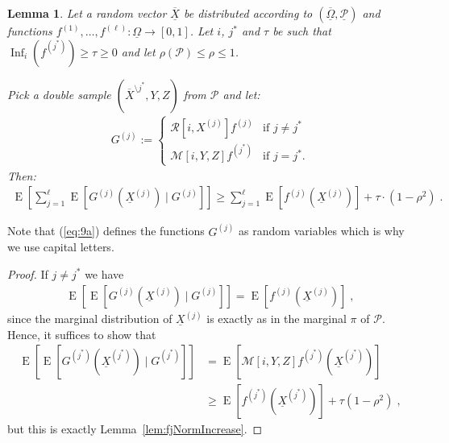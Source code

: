 \documentclass{daj}
\newcommand{\1}{\mathbbm{1}}
\theoremstyle{plain}
\newtheorem{lemma}[theorem]{Lemma}
\theoremstyle{definition}
\DeclareMathOperator*{\EE}{E}
\DeclareMathOperator{\Inf}{Inf}
\newcommand{\cM}{\mathcal{M}}
\newcommand{\cR}{\mathcal{R}}
\begin{document}
\begin{lemma}\label{lem:averageNormIncrease}
Let a random vector $\overline{\underline{X}}$ be distributed according to
$(\overline{\underline{\Omega}}, \underline{\mathcal{P}})$ and functions
$f^{(1)}, \ldots, f^{(\ell)}: \underline{\Omega} \to [0, 1]$.
Let $i$, $j^*$ and $\tau$ be such that
$\Inf_{i}(f^{(j^*)}) \ge \tau \ge 0$ and let $\rho(\mathcal{P}) \le \rho \le 1$.

Pick a double sample $(\overline{X}^{\setminus j^*}, Y, Z)$ from $\mathcal{P}$ and let:
\begin{align}\label{eq:9a}
G^{(j)} := 
\begin{cases}
\cR[i,X^{(j)}]f^{(j)} & \text{if $j \neq j^*$}\\
\cM[i,Y,Z]f^{(j^*)} & \text{if $j = j^*$}.
\end{cases}
\end{align}
Then:
\begin{align}
\EE\left[\sum_{j=1}^{\ell} \EE[G^{(j)}(\underline{X}^{(j)}) \mid G^{(j)}] \right]
 \geq 
\sum_{j=1}^{\ell} \EE\left[ f^{(j)}(\underline{X}^{(j)})\right] + \tau \cdot (1-\rho^2)
\; .
\end{align}
\end{lemma}
Note that (\ref{eq:9a}) defines the functions $G^{(j)}$ as random variables
which is why we use capital letters.
\begin{proof}
If $j \neq j^*$ we have
\begin{align}
\EE \left[ \EE[G^{(j)}(\underline{X}^{(j)}) \mid G^{(j)}] \right]  = 
\EE[f^{(j)}(\underline{X}^{(j)})]\;,
\end{align}
since the marginal distribution of $\underline{X}^{(j)}$ is exactly as in the 
marginal $\pi$ of $\mathcal{P}$.
Hence, it suffices to show that
\begin{align*}
\EE\left[ \EE[G^{(j^*)}(\underline{X}^{(j^*)})
 \mid G^{(j^*)} ] \right]
&= 
\EE\left[ \cM[i,Y,Z]f^{(j^*)}(\underline{X}^{(j^*)}) 
 \right]
\\&\geq 
\EE[f^{(j^*)}(\underline{X}^{(j^*)})] + \tau(1-\rho^2)\;,
\end{align*}
but this is exactly Lemma~\ref{lem:fjNormIncrease}.
\end{proof}
\end{document}
